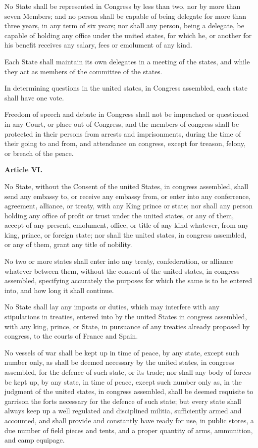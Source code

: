 No State shall be represented in Congress by less than two, nor by more than seven Members; and no person shall be capable of being delegate for more than three years, in any term of six years; nor shall any person, being a delegate, be capable of holding any office under the united states, for which he, or another for his benefit receives any salary, fees or emolument of any kind.

Each State shall maintain its own delegates in a meeting of the states, and while they act as members of the committee of the states.

In determining questions in the united states, in Congress assembled, each state shall have one vote.

Freedom of speech and debate in Congress shall not be impeached or questioned in any Court, or place out of Congress, and the members of congress shall be protected in their persons from arrests and imprisonments, during the time of their going to and from, and attendance on congress, except for treason, felony, or breach of the peace.

\begin{center}
\textbf{Article VI.} 
\end{center}

No State, without the Consent of the united States, in congress assembled, shall send any embassy to, or receive any embassy from, or enter into any conferrence, agreement, alliance, or treaty, with any King prince or state; nor shall any person holding any office of profit or trust under the united states, or any of them, accept of any present, emolument, office, or title of any kind whatever, from any king, prince, or foreign state; nor shall the united states, in congress assembled, or any of them, grant any title of nobility.

No two or more states shall enter into any treaty, confederation, or alliance whatever between them, without the consent of the united states, in congress assembled, specifying accurately the purposes for which the same is to be entered into, and how long it shall continue.

No State shall lay any imposts or duties, which may interfere with any stipulations in treaties, entered into by the united States in congress assembled, with any king, prince, or State, in pursuance of any treaties already proposed by congress, to the courts of France and Spain.

No vessels of war shall be kept up in time of peace, by any state, except such number only, as shall be deemed necessary by the united states, in congress assembled, for the defence of such state, or its trade; nor shall any body of forces be kept up, by any state, in time of peace, except such number only as, in the judgment of the united states, in congress assembled, shall be deemed requisite to garrison the forts necessary for the defence of such state; but every state shall always keep up a well regulated and disciplined militia, sufficiently armed and accounted, and shall provide and constantly have ready for use, in public stores, a due number of field pieces and tents, and a proper quantity of arms, ammunition, and camp equipage.

